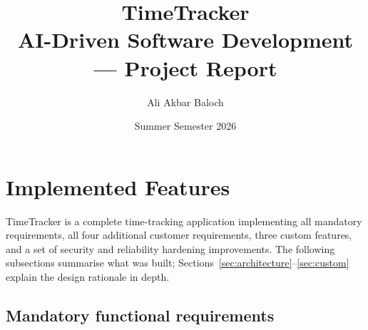 \documentclass[a4paper, 12pt]{article}
\title{\textbf{TimeTracker}\\[0.4em]
       \large AI-Driven Software Development --- Project Report}
\author{Ali Akbar Baloch}
\date{Summer Semester 2026}
\begin{document}
\maketitle
\tableofcontents
\newpage

\section{Implemented Features}

TimeTracker is a complete time-tracking application implementing all mandatory requirements,
all four additional customer requirements, three custom features, and a set of security and
reliability hardening improvements. The following subsections summarise what was built;
Sections~\ref{sec:architecture}--\ref{sec:custom} explain the design rationale in depth.

\subsection{Mandatory functional requirements}
\end{document}
